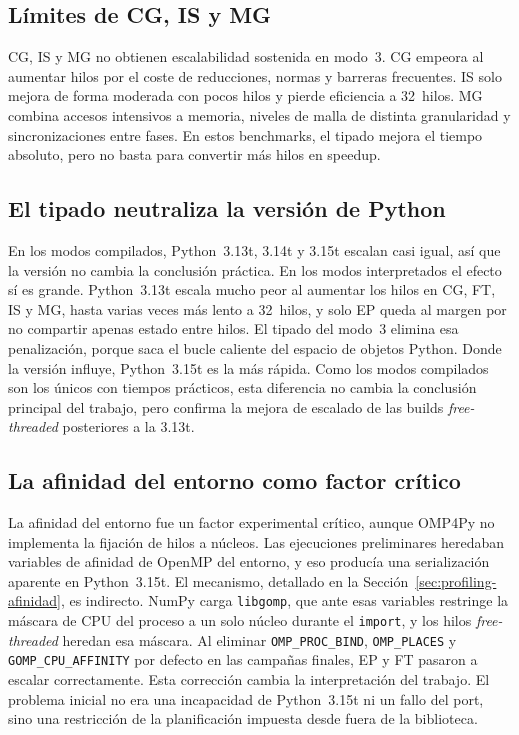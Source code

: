 \subsection{Límites de CG, IS y MG}
CG, IS y MG no obtienen escalabilidad sostenida en modo~3. CG empeora al
aumentar hilos por el coste de reducciones, normas y barreras frecuentes. IS
solo mejora de forma moderada con pocos hilos y pierde eficiencia a 32~hilos.
MG combina accesos intensivos a memoria, niveles de malla de distinta
granularidad y sincronizaciones entre fases. En estos benchmarks, el tipado
mejora el tiempo absoluto, pero no basta para convertir más hilos en speedup.

\subsection{El tipado neutraliza la versión de Python}
En los modos compilados, Python~3.13t, 3.14t y 3.15t escalan casi igual, así que
la versión no cambia la conclusión práctica. En los modos interpretados el efecto
sí es grande. Python~3.13t escala mucho peor al aumentar los hilos en CG, FT, IS y
MG, hasta varias veces más lento a 32~hilos, y solo EP queda al margen por no
compartir apenas estado entre hilos. El tipado del modo~3 elimina esa penalización, porque saca el
bucle caliente del espacio de objetos Python. Donde la versión influye,
Python~3.15t es la más rápida. Como los modos compilados son los únicos con
tiempos prácticos, esta diferencia no cambia la conclusión principal del trabajo,
pero confirma la mejora de escalado de las builds \emph{free-threaded} posteriores
a la 3.13t.

\subsection{La afinidad del entorno como factor crítico}
La afinidad del entorno fue un factor experimental crítico, aunque OMP4Py no
implementa la fijación de hilos a núcleos. Las ejecuciones preliminares
heredaban variables de afinidad de OpenMP del entorno, y eso producía una
serialización aparente en Python~3.15t. El mecanismo, detallado en la
Sección~\ref{sec:profiling-afinidad}, es indirecto. NumPy carga
\texttt{libgomp}, que ante esas variables restringe la máscara de CPU del
proceso a un solo núcleo durante el \texttt{import}, y los hilos
\emph{free-threaded} heredan esa máscara. Al eliminar \texttt{OMP\_PROC\_BIND},
\texttt{OMP\_PLACES} y \texttt{GOMP\_CPU\_AFFINITY} por defecto en las campañas
finales, EP y FT pasaron a escalar correctamente. Esta corrección cambia la
interpretación del trabajo. El problema inicial no era una incapacidad de
Python~3.15t ni un fallo del port, sino una restricción de la planificación
impuesta desde fuera de la biblioteca.

